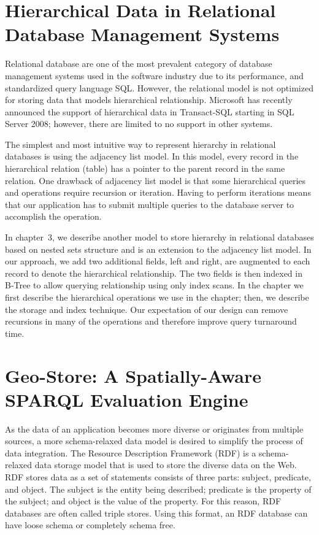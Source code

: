 \section{Hierarchical Data in Relational Database Management Systems}

Relational database are one of the most prevalent category of database management systems used in the software industry due to its performance, and standardized query language SQL. However, the relational model is not optimized for storing data that models hierarchical relationship. Microsoft has recently announced the support of hierarchical data in Transact-SQL starting in SQL Server 2008\cite{expert_sql_server}; however, there are limited to no support in other systems.

The simplest and most intuitive way to represent hierarchy in relational databases is using the adjacency list model. In this model, every record in the hierarchical relation (table) has a pointer to the parent record in the same relation. One drawback of adjacency list model is that some hierarchical queries and operations require recursion or iteration. Having to perform iterations means that our application has to submit multiple queries to the database server to accomplish the operation.

In chapter~3, we describe another model to store hierarchy in relational databases based on nested sets structure and is an extension to the adjacency list model. In our approach, we add two additional fields, left and right, are augmented to each record to denote the hierarchical relationship. The two fields is then indexed in B-Tree to allow querying relationship using only index scans. In the chapter we first describe the hierarchical operations we use in the chapter; then, we describe the storage and index technique. Our expectation of our design can remove recursions in many of the operations and therefore improve query turnaround time.

\section{Geo-Store: A Spatially-Aware SPARQL Evaluation Engine}

As the data of an application becomes more diverse or originates from multiple sources, a more schema-relaxed data model is desired to simplify the process of data integration. The Resource Description Framework (RDF) is a schema-relaxed data storage model that is used to store the diverse data on the Web. RDF stores data as a set of statements consists of three parts: subject, predicate, and object. The subject is the entity being described; predicate is the property of the subject; and object is the value of the property. For this reason, RDF databases are often called triple stores. Using this format, an RDF database can have loose schema or completely schema free.

